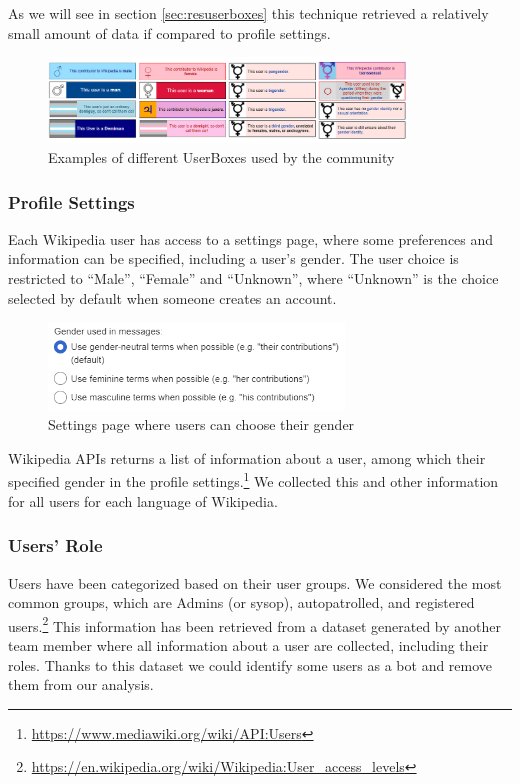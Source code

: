 As we will see in section \ref{sec:resuserboxes} this technique retrieved a relatively small amount of data if compared to profile settings.

\begin{figure}[H]
    \centering
    \includegraphics[width=0.85\textwidth]{./img/ubx.png}
    \caption{Examples of different UserBoxes used by the community}
    \label{fig:ubx}
\end{figure}

\subsubsection{Profile Settings}
\label{sec:profilesettings}
Each Wikipedia user has access to a settings page, where some preferences and information can be specified, including a user's gender. The user choice is restricted to “Male”, “Female” and “Unknown”, where “Unknown” is the choice selected by default when someone creates an account.

\begin{figure}[H]
    \centering
    \includegraphics[width=0.7\textwidth]{./img/settings.png}
    \caption{Settings page where users can choose their gender}
    \label{fig:chainsuser}
\end{figure}

Wikipedia APIs returns a list of information about a user, among which their specified gender in the profile settings.\footnote{\url{https://www.mediawiki.org/wiki/API:Users}} We collected this and other information for all users for each language of Wikipedia.

\subsubsection{Users’ Role}
\label{sec:usersrole}
Users have been categorized based on their user groups. We considered the most common groups, which are Admins (or sysop), autopatrolled, and registered users.\footnote{\url{https://en.wikipedia.org/wiki/Wikipedia:User_access_levels}} This information has been retrieved from a dataset generated by another team member where all information about a user are collected, including their roles. Thanks to this dataset we could identify some users as a bot and remove them from our analysis.

